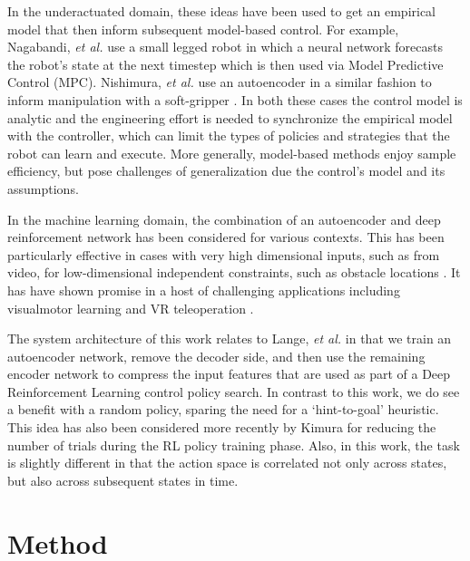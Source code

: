 \documentclass[letterpaper, 10 pt, conference]{ieeeconf}
\begin{document}
In the underactuated domain, these ideas have been used to get an empirical model that then inform subsequent model-based control.  For example, Nagabandi, \emph{et al.} \cite{nagabandi2018learning} use a small legged robot in which a neural network forecasts the robot's state at the next timestep which is then used via Model Predictive Control (MPC).  Nishimura, \emph{et al.} use an autoencoder in a similar fashion to inform manipulation with a soft-gripper \cite{nishimura2017thin}.  In both these cases the control model is analytic and the engineering effort is needed to synchronize the empirical model with the controller, which can limit the types of policies and strategies that the robot can learn and execute.  
More generally, model-based methods enjoy sample efficiency, but pose challenges of generalization due the control's model and its assumptions.  

In the machine learning domain, the combination of an autoencoder and deep reinforcement network has been considered for various contexts. 
This has been particularly effective in cases with very high dimensional inputs, such as from video, for low-dimensional independent constraints, such as obstacle locations \cite{finn2016deep, bitzer2010using, lynch2019learning}.  
It has have shown promise in a host of challenging applications including visualmotor learning \cite{finn2016deep} and VR teleoperation \cite{zhang2018deep}. 

The system architecture of this work relates to Lange, \emph{et al.} \cite{lange2010deep} in that we train an autoencoder network, remove the decoder side, and then use the remaining encoder network to compress the input features that are used as part of a Deep Reinforcement Learning control policy search.  In contrast to this work, we do see a benefit with a random policy, sparing the need for a `hint-to-goal' heuristic.  This idea has also been considered more recently by Kimura \cite{kimura2018daqn} for reducing the number of trials during the RL policy training phase.   
Also, in this work, the task is slightly different in that the action space is correlated not only across states, but also across subsequent states in time.  



\section{Method}
\end{document}
